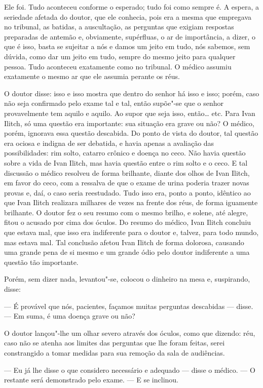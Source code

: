 Ele foi. Tudo aconteceu conforme o esperado; tudo foi como sempre é. A
espera, a seriedade afetada do doutor, que ele conhecia, pois era a
mesma que empregava no tribunal, as batidas, a auscultação, as perguntas
que exigiam respostas preparadas de antemão e, obviamente, supérfluas, o
ar de importância, a dizer, o que é isso, basta se sujeitar a nós e
damos um jeito em tudo, nós sabemos, sem dúvida, como dar um jeito em
tudo, sempre do mesmo jeito para qualquer pessoa. Tudo aconteceu
exatamente como no tribunal. O médico assumiu exatamente o mesmo ar que
ele assumia perante os réus.

O doutor disse: isso e isso mostra que dentro do senhor há isso e isso;
porém, caso não seja confirmado pelo exame tal e tal, então supõe"-se que
o senhor provavelmente tem aquilo e aquilo. Ao supor que seja isso,
então\ldots{} etc. Para Ivan Ilitch, só uma questão era importante: sua
situação era grave ou não? O médico, porém, ignorava essa questão
descabida. Do ponto de vista do doutor, tal questão era ociosa e indigna
de ser debatida, e havia apenas a avaliação das possibilidades: rim
solto, catarro crônico e doença no ceco. Não havia questão sobre a vida
de Ivan Ilitch, mas havia questão entre o rim solto e o ceco. E tal
discussão o médico resolveu de forma brilhante, diante dos olhos de Ivan
Ilitch, em favor do ceco, com a ressalva de que o exame de urina poderia
trazer novas provas e, daí, o caso seria reestudado. Tudo isso era,
ponto a ponto, idêntico ao que Ivan Ilitch realizara milhares de vezes
na frente dos réus, de forma iguamente brilhante. O doutor fez o seu
resumo com o mesmo brilho, e solene, até alegre, fitou o acusado por
cima dos óculos. Do resumo do médico, Ivan Ilitch concluiu que estava
mal, que isso era indiferente para o doutor e, talvez, para todo mundo,
mas estava mal. Tal conclusão afetou Ivan Ilitch de forma dolorosa,
causando uma grande pena de si mesmo e um grande ódio pelo doutor
indiferente a uma questão tão importante.

Porém, sem dizer nada, levantou"-se, colocou o dinheiro na mesa e,
suspirando, disse:

--- É provável que nós, pacientes, façamos muitas perguntas descabidas ---
disse. --- Em suma, é uma doença grave ou não?

O doutor lançou"-lhe um olhar severo através dos óculos, como que
dizendo: réu, caso não se atenha aos limites das perguntas que lhe foram
feitas, serei constrangido a tomar medidas para sua remoção da sala de
audiências.

--- Eu já lhe disse o que considero necessário e adequado --- disse o
médico. --- O restante será demonstrado pelo exame. --- E se inclinou.

